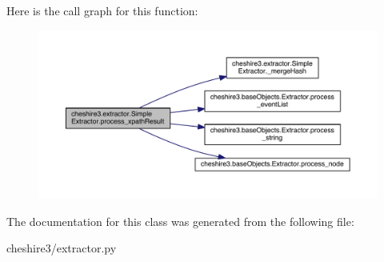 Here is the call graph for this function\-:
\nopagebreak
\begin{figure}[H]
\begin{center}
\leavevmode
\includegraphics[width=350pt]{classcheshire3_1_1extractor_1_1_simple_extractor_af58ab4566f5fe1f86c635afec2e5037e_cgraph}
\end{center}
\end{figure}




The documentation for this class was generated from the following file\-:\begin{DoxyCompactItemize}
\item 
cheshire3/extractor.\-py\end{DoxyCompactItemize}
